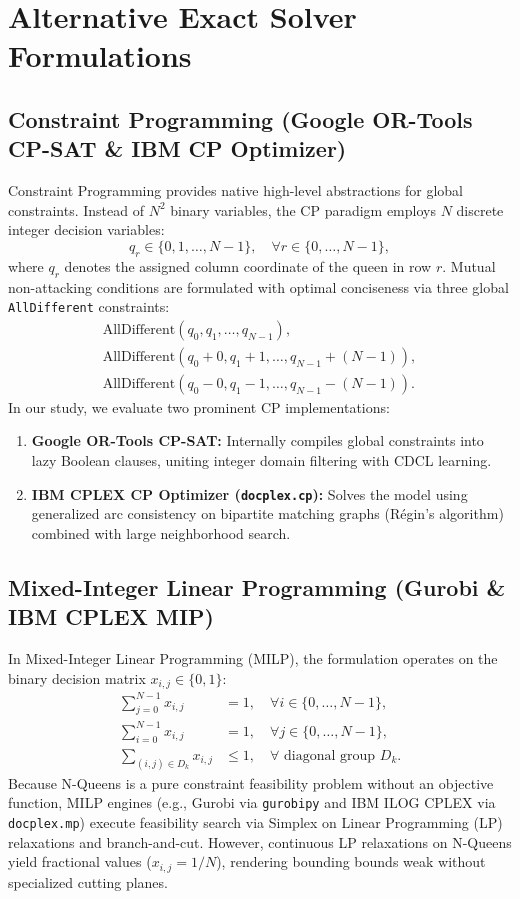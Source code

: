 \documentclass[a4paper,fleqn]{cas-sc}
\begin{document}
\section{Alternative Exact Solver Formulations}

\subsection{Constraint Programming (Google OR-Tools CP-SAT \& IBM CP Optimizer)}
Constraint Programming provides native high-level abstractions for global constraints. Instead of $N^2$ binary variables, the CP paradigm employs $N$ discrete integer decision variables:
\begin{equation}
q_r \in \{0, 1, \dots, N-1\}, \quad \forall r \in \{0, \dots, N-1\},
\end{equation}
where $q_r$ denotes the assigned column coordinate of the queen in row $r$. Mutual non-attacking conditions are formulated with optimal conciseness via three global \texttt{AllDifferent} constraints:
\begin{align}
\text{AllDifferent}(q_0, q_1, \dots, q_{N-1}), \\
\text{AllDifferent}(q_0 + 0, q_1 + 1, \dots, q_{N-1} + (N-1)), \\
\text{AllDifferent}(q_0 - 0, q_1 - 1, \dots, q_{N-1} - (N-1)).
\end{align}
In our study, we evaluate two prominent CP implementations:
\begin{enumerate}
    \item \textbf{Google OR-Tools CP-SAT:} Internally compiles global constraints into lazy Boolean clauses, uniting integer domain filtering with CDCL learning.
    \item \textbf{IBM CPLEX CP Optimizer (\texttt{docplex.cp}):} Solves the model using generalized arc consistency on bipartite matching graphs (R\'egin's algorithm) combined with large neighborhood search.
\end{enumerate}

\subsection{Mixed-Integer Linear Programming (Gurobi \& IBM CPLEX MIP)}
In Mixed-Integer Linear Programming (MILP), the formulation operates on the binary decision matrix $x_{i,j} \in \{0, 1\}$:
\begin{align}
\sum_{j=0}^{N-1} x_{i,j} &= 1, \quad \forall i \in \{0, \dots, N-1\}, \\
\sum_{i=0}^{N-1} x_{i,j} &= 1, \quad \forall j \in \{0, \dots, N-1\}, \\
\sum_{(i,j) \in D_k} x_{i,j} &\le 1, \quad \forall \text{ diagonal group } D_k.
\end{align}
Because N-Queens is a pure constraint feasibility problem without an objective function, MILP engines (e.g., Gurobi via \texttt{gurobipy} and IBM ILOG CPLEX via \texttt{docplex.mp}) execute feasibility search via Simplex on Linear Programming (LP) relaxations and branch-and-cut. However, continuous LP relaxations on N-Queens yield fractional values ($x_{i,j} = 1/N$), rendering bounding bounds weak without specialized cutting planes.
\end{document}
